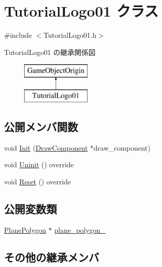\hypertarget{class_tutorial_logo01}{}\section{Tutorial\+Logo01 クラス}
\label{class_tutorial_logo01}


{\ttfamily \#include $<$Tutorial\+Logo01.\+h$>$}

Tutorial\+Logo01 の継承関係図\begin{figure}[H]
\begin{center}
\leavevmode
\includegraphics[height=2.000000cm]{class_tutorial_logo01}
\end{center}
\end{figure}
\subsection*{公開メンバ関数}
\begin{DoxyCompactItemize}
\item 
void \mbox{\hyperlink{class_tutorial_logo01_a6c9e07a064789ac5f5e9c73832ce56d2}{Init}} (\mbox{\hyperlink{class_draw_component}{Draw\+Component}} $\ast$draw\+\_\+component)
\item 
void \mbox{\hyperlink{class_tutorial_logo01_aa6fd636ad745d8712ace1c82da285828}{Uninit}} () override
\item 
void \mbox{\hyperlink{class_tutorial_logo01_a01515b3f54e6731e42d60af5320ff7eb}{Reset}} () override
\end{DoxyCompactItemize}
\subsection*{公開変数類}
\begin{DoxyCompactItemize}
\item 
\mbox{\hyperlink{class_plane_polygon}{Plane\+Polygon}} $\ast$ \mbox{\hyperlink{class_tutorial_logo01_ae38e16b590122bec07b503ed08224d85}{plane\+\_\+polygon\+\_\+}}
\end{DoxyCompactItemize}
\subsection*{その他の継承メンバ}


